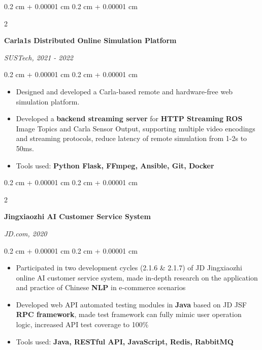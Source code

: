 \documentclass[10pt, letterpaper]{article}
\newenvironment{highlights}{
    \begin{itemize}[
        topsep=0.10 cm,
        parsep=0.10 cm,
        partopsep=0pt,
        itemsep=0pt,
        leftmargin=0.4 cm + 10pt
    ]
}{
    \end{itemize}
} %
\newenvironment{onecolentry}{
    \begin{adjustwidth}{
        0.2 cm + 0.00001 cm
    }{
        0.2 cm + 0.00001 cm
    }
}{
    \end{adjustwidth}
} %
\newenvironment{twocolentry}[2][]{
    \onecolentry
    \def\secondColumn{#2}
    \setcolumnwidth{\fill, 4.5 cm}
    \begin{paracol}{2}
}{
    \switchcolumn \raggedleft \secondColumn
    \end{paracol}
    \endonecolentry
} %
\begin{document}
        \vspace{0.15 cm}

        \begin{twocolentry}{
            
            
        \textit{SUSTech, 2021 - 2022}}
            \textbf{Carla1s Distributed Online Simulation Platform}
        \end{twocolentry}

        \vspace{0.10 cm}
        \begin{onecolentry}
            \begin{highlights}
                \item Designed and developed a Carla-based remote and hardware-free web simulation platform.
                \item Developed a \textbf{backend streaming server} for \textbf{HTTP Streaming} \textbf{ROS} Image Topics and Carla Sensor Output, supporting multiple video encodings and streaming protocols, reduce latency of remote simulation from 1-2s to 50ms.
                \item Tools used: \textbf{Python Flask, FFmpeg, Ansible, Git, Docker}
            \end{highlights}
        \end{onecolentry}

        \vspace{0.15 cm}

        \begin{twocolentry}{
            
            
        \textit{JD.com, 2020}}
            \textbf{Jingxiaozhi AI Customer Service System}
        \end{twocolentry}

        \vspace{0.10 cm}
        \begin{onecolentry}
            \begin{highlights}
                \item Participated in two development cycles (2.1.6 \& 2.1.7) of JD Jingxiaozhi online AI customer service system, made in-depth research on the application and practice of Chinese \textbf{NLP} in e-commerce scenarios
                \item Developed web API automated testing modules in \textbf{Java} based on JD JSF \textbf{RPC framework}, made test framework can fully mimic user operation logic, increased API test coverage to 100\% 
                \item Tools used: \textbf{Java, RESTful API, JavaScript, Redis, RabbitMQ}
            \end{highlights}
        \end{onecolentry}
\end{document}
